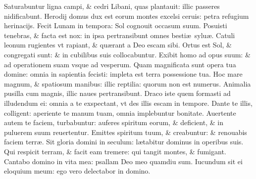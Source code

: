 \documentclass[a5paper,10pt]{book}
\def\ae{æ}
\begin{document}
\begin{multicols*}{2}
\newline \color{red} S\color{black}aturabuntur ligna campi, \& cedri Libani, quas plantauit: illic passeres nidificabunt.
\newline \color{red} H\color{black}erodij domus dux est eorum montes excelsi ceruis: petra refugium herinacijs.
\newline \color{red} F\color{black}ecit Lunam in tempora: Sol cognouit occasum suum.
\newline \color{red} P\color{black}osuisti tenebras, \& facta est nox: in ipsa pertransibunt omnes besti\ae \ sylu\ae .
\newline \color{red} C\color{black}atuli leonum rugientes vt rapiant, \& qu\ae rant a Deo escam sibi.
\newline \color{red} O\color{black}rtus est Sol, \& congregati sunt: \& in cubilibus suis collocabuntur.
\newline \color{red} E\color{black}xibit homo ad opus suum: \& ad operationem suam vsque ad vesperum.
\newline \color{red} Q\color{black}uam magnificata sunt opera tua domine: omnia in sapientia fecisti: impleta est terra possessione tua.
\newline \color{red} H\color{black}oc mare magnum, \& spatiosum manibus: illic reptilia: quorum non est numerus.
\newline \color{red} A\color{black}nimalia pusilla cum magnis, illic naues pertransibunt.
\newline \color{red} D\color{black}raco iste quem formasti ad illudendum ei: omnia a te exspectant, vt des illis escam in tempore.
\newline \color{red} D\color{black}ante te illis, colligent: aperiente te manum tuam, omnia implebuntur bonitate.
\newline \color{red} A\color{black}uertente autem te faciem, turbabuntur: auferes spiritum eorum, \& deficient, \& in puluerem suum reuertentur.
\newline \color{red} E\color{black}mittes spiritum tuum, \& creabuntur: \& renouabis faciem terr\ae .
\newline \color{red} S\color{black}it gloria domini in seculum: l\ae tabitur dominus in operibus suis.
\newline \color{red} Q\color{black}ui respicit terram, \& facit eam tremere: qui tangit montes, \& fumigant.
\newline \color{red} C\color{black}antabo domino in vita mea: psallam Deo meo quamdiu sum.
\newline \color{red} I\color{black}ucundum sit ei eloquium meum: ego vero delectabor in domino.

\end{multicols*}
\end{document}
